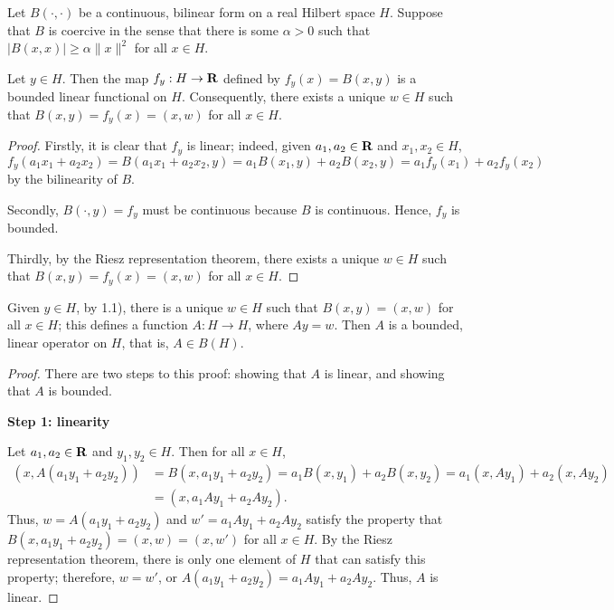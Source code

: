 \documentclass{homework}
\begin{document}
	\maketitle
	
	\question
	Let $B(\cdot,\cdot)$ be a continuous, bilinear form on a real Hilbert space $H$. Suppose that $B$ is coercive in the sense that there is some $\alpha > 0$ such that $|B(x,x)| \ge \alpha\lVert x\rVert^2$ for all $x \in H$.
	\begin{arabicparts}
		\questionpart 
		Let $y \in H$. Then the map $f_y : H \to \textbf{R}$ defined by $f_y(x) = B(x,y)$ is a bounded linear functional on $H$. Consequently, there exists a unique $w \in H$ such that $B(x,y) = f_y(x) = (x,w)$ for all $x \in H$.
		\begin{proof}
			Firstly, it is clear that $f_y$ is linear; indeed, given $a_1, a_2 \in \textbf{R}$ and $x_1, x_2 \in H$,
			\begin{equation}
				f_y(a_1x_1+a_2x_2) = B(a_1x_1+a_2x_2,y) = a_1B(x_1,y) + a_2B(x_2,y) = a_1f_y(x_1) + a_2f_y(x_2)
			\end{equation}
			by the bilinearity of $B$.
			
			Secondly, $B(\cdot, y)=f_y$ must be continuous because $B$ is continuous. Hence, $f_y$ is bounded.
			
			Thirdly, by the Riesz representation theorem, there exists a unique $w \in H$ such that $B(x,y) = f_y(x) = (x,w)$ for all $x \in H$.
		\end{proof}
		
		\questionpart 
		Given $y \in H$, by 1.1), there is a unique $w\in H$ such that $B(x,y) = (x,w)$ for all $x \in H$; this defines a function $A: H \to H$, where $Ay = w$. Then $A$ is a bounded, linear operator on $H$, that is, $A \in B(H)$.
		\begin{proof}
			There are two steps to this proof: showing that $A$ is linear, and showing that $A$ is bounded.
			
			\textbf{Step 1: linearity}
			
			Let $a_1, a_2 \in \textbf{R}$ and $y_1, y_2 \in H$. Then for all $x \in H$,
			\begin{equation}
			\begin{aligned}
				(x, A(a_1y_1+a_2y_2)) &= B(x,a_1y_1 + a_2y_2) = a_1B(x,y_1) + a_2B(x,y_2) = a_1(x,Ay_1) + a_2(x,Ay_2) \\
				&= (x, a_1Ay_1 + a_2Ay_2).
			\end{aligned}
			\end{equation}
			Thus, $w=A(a_1y_1+a_2y_2)$ and $w' = a_1Ay_1 + a_2Ay_2$ satisfy the property that $B(x,a_1y_1+a_2y_2) = (x,w) = (x,w')$ for all $x \in H$. By the Riesz representation theorem, there is only one element of $H$ that can satisfy this property; therefore, $w=w'$, or $A(a_1y_1 + a_2y_2) = a_1Ay_1 + a_2Ay_2$. Thus, $A$ is linear.
			

\end{proof}
\end{arabicparts}
\end{document}
